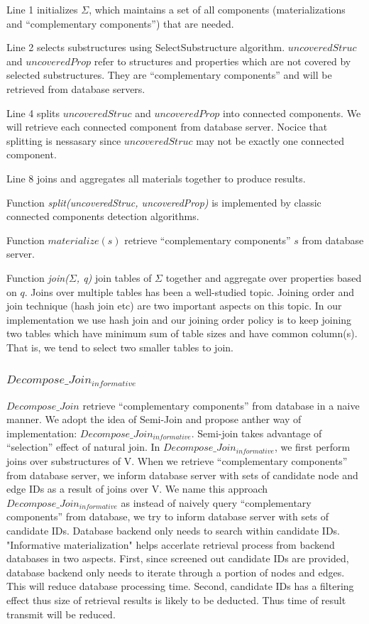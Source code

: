 Line 1 initializes $\Sigma$, which maintains a set of all components (materializations and ``complementary  components'') that are needed.

Line 2 selects substructures using SelectSubstructure algorithm. $uncoveredStruc$ and $uncoveredProp$ refer to structures and properties which are not covered by selected substructures. They are ``complementary components'' and will be retrieved from database servers.

Line 4 splits $uncoveredStruc$ and $uncoveredProp$ into connected components. We will retrieve each connected component from database server. Nocice that splitting is nessasary since $uncoveredStruc$ may not be exactly one connected component.

Line 8 joins and aggregates all materials together to produce results. 

Function \textit{split(uncoveredStruc, uncoveredProp)} is implemented by classic connected components detection algorithms.

Function \textit{$materialize(s)$} retrieve ``complementary components'' $s$ from database server.

Function \textit{join($\Sigma$, q)} join tables of $\Sigma$ together and aggregate over properties based on $q$. Joins over multiple tables has been a well-studied topic. Joining order and join technique (hash join etc) are two important aspects on this topic. In our implementation we use hash join and our joining order policy is to keep joining two tables which have minimum sum of table sizes and have common column(s). That is, we tend to select two smaller tables to join.  

\subsubsection{$Decompose\_Join_{informative}$}
$Decompose\_Join$ retrieve ``complementary components'' from database in a naive manner. We adopt the idea of Semi-Join \cite{DBLP:journals/dr/Ozsoyoglu99} and propose anther way of implementation: $Decompose\_Join_{informative}$. Semi-join takes advantage of ``selection'' effect of natural join. In $Decompose\_Join_{informative}$, we first perform joins over substructures of V. When we retrieve ``complementary components'' from database server, we inform database server with sets of candidate node and edge IDs as a result of joins over V. We name this approach $Decompose\_Join_{informative}$ as instead of naively query ``complementary components'' from database, we try to inform database server with sets of candidate IDs. Database backend only needs to search within candidate IDs. "Informative materialization" helps accerlate retrieval process from backend databases in two aspects. First, since screened out candidate IDs are provided, database backend only needs to iterate through a portion of nodes and edges. This will reduce database processing time. Second, candidate IDs has a filtering effect thus size of retrieval results is likely to be deducted. Thus time of result transmit will be reduced. 

